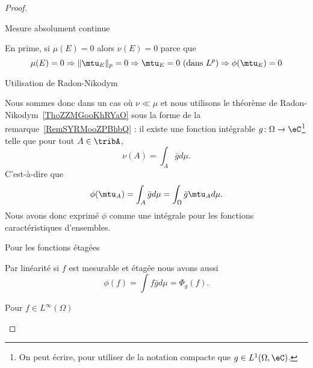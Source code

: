 \begin{proof}
\begin{subproof}
        \item[Mesure absolument continue]

            En prime, si \( \mu(E)=0\) alors \( \nu(E)=0\) parce que
            \begin{equation}
                \mu(E)=0\Rightarrow \| \mtu_E \|_p=0\Rightarrow \mtu_E=0\text{ (dans } L^p\text{)}\Rightarrow\phi(\mtu_E)=0
            \end{equation}

        \item[Utilisation de Radon-Nikodym]

            Nous sommes donc dans un cas où \( \nu\ll\mu\) et nous utilisons le théorème de Radon-Nikodym~\ref{ThoZZMGooKhRYaO} sous la forme de la remarque~\ref{RemSYRMooZPBhbQ} : il existe une fonction intégrable \( g\colon \Omega\to \eC\)\footnote{On peut écrire, pour utiliser de la notation compacte que $ g\in L^1(\Omega,\eC)$.} telle que pour tout \( A\in\tribA\),
            \begin{equation}
                \nu(A)=\int_A\bar gd\mu.
            \end{equation}
            C'est-à-dire que
            \begin{equation}
                \phi(\mtu_A)=\int_A\bar gd\mu=\int_{\Omega}\bar g\mtu_Ad\mu.
            \end{equation}
            Nous avons donc exprimé \( \phi\) comme une intégrale pour les fonctions caractéristiques d'ensembles.

        \item[Pour les fonctions étagées]

            Par linéarité si \( f\) est mesurable et étagée nous avons aussi
            \begin{equation}
                \phi(f)=\int f\bar gd\mu=\Phi_g(f).
            \end{equation}

        \item[Pour \( f\in L^{\infty}(\Omega)\)]


\end{subproof}
\end{proof}
